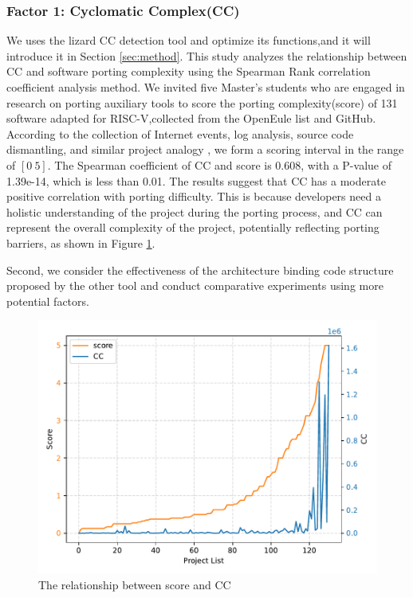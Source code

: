 \documentclass[sigconf,screen,review,anonymous]{acmart}
\begin{document}
\subsubsection{Factor 1: Cyclomatic Complex(CC)}
\label{sec:factor-1}
We uses the lizard CC detection tool and optimize its functions,and it will introduce it in Section \ref{sec:method}.
This study analyzes the relationship between CC and software porting complexity using the Spearman Rank correlation coefficient analysis method.
We invited five Master's students who are engaged in research on porting auxiliary tools to score the porting complexity(score) of 131 software adapted for RISC-V,collected from the OpenEule list\citep{stage2023} and GitHub.
According to the collection of Internet events, log analysis, source code dismantling, and similar project analogy \cite{liangguanyu2020}, we form a scoring interval in the range of $[0~5]$.
The Spearman coefficient of CC and score is 0.608, with a P-value of 1.39e-14, which is less than 0.01.
The results suggest that CC has a moderate positive correlation with porting difficulty.
This is because developers need a holistic understanding of the project during the porting process, and CC can represent the overall complexity of the project, potentially reflecting porting barriers, as shown in Figure \ref{fig:figure2}.




Second, we consider the effectiveness of the architecture binding code structure proposed by the other tool and conduct comparative experiments using more potential factors.
\begin{figure}
  \centering
  \includegraphics[width=\linewidth]{figure2.pdf}
  \caption{The relationship between score and CC}
  \label{fig:figure2}
\end{figure}
\end{document}
